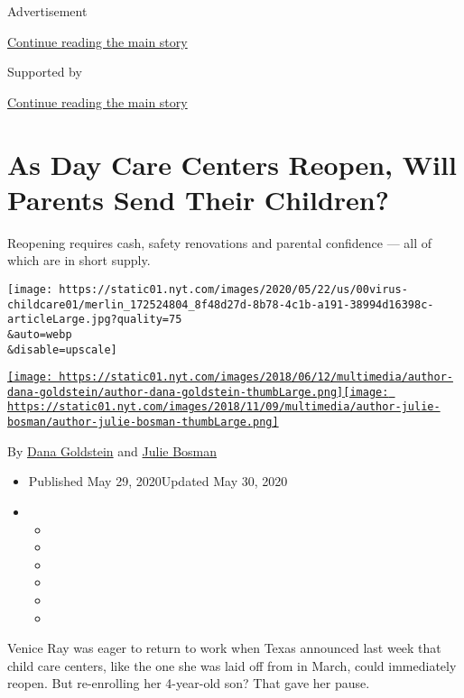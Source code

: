 Advertisement

\protect\hyperlink{after-top}{Continue reading the main story}

Supported by

\protect\hyperlink{after-sponsor}{Continue reading the main story}

\hypertarget{as-day-care-centers-reopen-will-parents-send-their-children}{%
\section{As Day Care Centers Reopen, Will Parents Send Their
Children?}\label{as-day-care-centers-reopen-will-parents-send-their-children}}

Reopening requires cash, safety renovations and parental confidence ---
all of which are in short supply.

\texttt{[image: https://static01.nyt.com/images/2020/05/22/us/00virus-childcare01/merlin\_172524804\_8f48d27d-8b78-4c1b-a191-38994d16398c-articleLarge.jpg?quality=75\\\&auto=webp\\\&disable=upscale]}

\href{https://www.nytimes.com/by/dana-goldstein}{\texttt{[image: https://static01.nyt.com/images/2018/06/12/multimedia/author-dana-goldstein/author-dana-goldstein-thumbLarge.png]}}\href{https://www.nytimes.com/by/julie-bosman}{\texttt{[image: https://static01.nyt.com/images/2018/11/09/multimedia/author-julie-bosman/author-julie-bosman-thumbLarge.png]}}

By \href{https://www.nytimes.com/by/dana-goldstein}{Dana Goldstein} and
\href{https://www.nytimes.com/by/julie-bosman}{Julie Bosman}

\begin{itemize}
\item
  Published May 29, 2020Updated May 30, 2020
\item
  \begin{itemize}
  \item
  \item
  \item
  \item
  \item
  \item
  \end{itemize}
\end{itemize}

Venice Ray was eager to return to work when Texas announced last week
that child care centers, like the one she was laid off from in March,
could immediately reopen. But re-enrolling her 4-year-old son? That gave
her pause.

